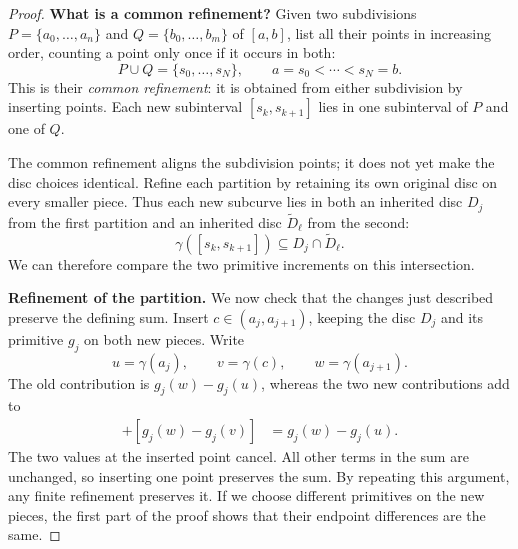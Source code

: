 \documentclass[11pt]{article}
\theoremstyle{plain}
\theoremstyle{definition}
\theoremstyle{remark}
\numberwithin{equation}{section}
\begin{document}
\begin{proof}
\textbf{What is a common refinement?}
Given two subdivisions $P=\{a_0,\ldots,a_n\}$ and
$Q=\{b_0,\ldots,b_m\}$ of $[a,b]$, list all their points in increasing
order, counting a point only once if it occurs in both:
\[
 P\cup Q=\{s_0,\ldots,s_N\},\qquad a=s_0<\cdots<s_N=b.
\]
This is their \emph{common refinement}: it is obtained from either
subdivision by inserting points. Each new subinterval
$[s_k,s_{k+1}]$ lies in one subinterval of $P$ and one of $Q$.

\begin{center}
\end{center}

The common refinement aligns the subdivision points; it does not yet
make the disc choices identical. Refine each partition by retaining
its own original disc on every smaller piece. Thus each new subcurve
lies in both an inherited disc $D_j$ from the first partition and an
inherited disc $\widetilde D_\ell$ from the second:
\[
 \gamma([s_k,s_{k+1}])\subseteq D_j\cap\widetilde D_\ell.
\]
We can therefore compare the two primitive increments on this intersection.

\textbf{Refinement of the partition.}
We now check that the changes just described preserve the defining sum.
Insert $c\in(a_j,a_{j+1})$, keeping the disc $D_j$ and its primitive
$g_j$ on both new pieces. Write
\[
 u=\gamma(a_j),\qquad v=\gamma(c),\qquad w=\gamma(a_{j+1}).
\]
The old contribution is $g_j(w)-g_j(u)$, whereas the two new
contributions add to
\begin{align*}
 [g_j(v)-g_j(u)]+[g_j(w)-g_j(v)]
 &=g_j(w)-g_j(u).
\end{align*}
The two values at the inserted point cancel. All other terms in the
sum are unchanged, so inserting one point preserves the sum. By
repeating this argument, any finite refinement preserves it. If we
choose different primitives on the new pieces, the first part of the
proof shows that their endpoint differences are the same.


\end{proof}
\end{document}
